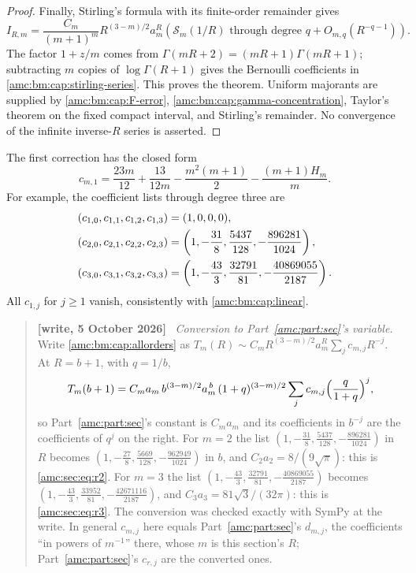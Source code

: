 \documentclass[11pt,letterpaper]{article}
\theoremstyle{remark}\newtheorem{remark}[theorem]{Remark}
\newenvironment{writenotedated}[1]{\par\smallskip\begin{quote}\small\textbf{[write, #1]}\ }{\end{quote}\smallskip}
\begin{document}
\begin{proof}
Finally, Stirling's formula with its finite-order remainder gives
\[
 I_{R,m}=\frac{C_m}{(m+1)^m}R^{(3-m)/2}a_m^R
 \left(\mathcal S_m(1/R)\text{ through degree }q+O_{m,q}(R^{-q-1})\right).
\]
The factor $1+z/m$ comes from $\Gamma(mR+2)=(mR+1)\Gamma(mR+1)$; subtracting $m$ copies of $\log\Gamma(R+1)$ gives the Bernoulli coefficients in \eqref{amc:bm:cap:stirling-series}. This proves the theorem. Uniform majorants are supplied by \eqref{amc:bm:cap:F-error}, \eqref{amc:bm:cap:gamma-concentration}, Taylor's theorem on the fixed compact interval, and Stirling's remainder. No convergence of the infinite inverse-$R$ series is asserted.
\end{proof}

The first correction has the closed form
\begin{equation}\label{amc:bm:cap:kappa}
 c_{m,1}=\frac{23m}{12}+\frac{13}{12m}
 -\frac{m^2(m+1)}2-\frac{(m+1)H_m}{m}.
\end{equation}
For example, the coefficient lists through degree three are
\begin{align}
 (c_{1,0},c_{1,1},c_{1,2},c_{1,3})&=(1,0,0,0),\notag\\
 (c_{2,0},c_{2,1},c_{2,2},c_{2,3})
 &=\left(1,-\frac{31}{8},\frac{5437}{128},-\frac{896281}{1024}\right),\label{amc:bm:cap:coefficients}\\
 (c_{3,0},c_{3,1},c_{3,2},c_{3,3})
 &=\left(1,-\frac{43}{3},\frac{32791}{81},-\frac{40869055}{2187}\right).\notag
\end{align}
All $c_{1,j}$ for $j\ge1$ vanish, consistently with \eqref{amc:bm:cap:linear}.

\begin{writenotedated}{5 October 2026}
\emph{Conversion to Part~\ref{amc:part:sec}'s variable.} Write \eqref{amc:bm:cap:allorders} as $T_m(R)\sim C_mR^{(3-m)/2}a_m^R\sum_jc_{m,j}R^{-j}$. At $R=b+1$, with $q=1/b$,
\[
 T_m(b+1)=C_ma_m\,b^{(3-m)/2}a_m^{\,b}\,(1+q)^{(3-m)/2}\sum_jc_{m,j}\Bigl(\frac q{1+q}\Bigr)^j,
\]
so Part~\ref{amc:part:sec}'s constant is $C_ma_m$ and its coefficients in $b^{-j}$ are the coefficients of $q^j$ on the right. For $m=2$ the list $(1,-\frac{31}8,\frac{5437}{128},-\frac{896281}{1024})$ in $R$ becomes $(1,-\frac{27}8,\frac{5669}{128},-\frac{962949}{1024})$ in $b$, and $C_2a_2=8/(9\sqrt\pi)$: this is \eqref{amc:sec:eq:r2}. For $m=3$ the list $(1,-\frac{43}3,\frac{32791}{81},-\frac{40869055}{2187})$ becomes $(1,-\frac{43}3,\frac{33952}{81},-\frac{42671116}{2187})$, and $C_3a_3=81\sqrt3/(32\pi)$: this is \eqref{amc:sec:eq:r3}. The conversion was checked exactly with SymPy at the write. In general $c_{m,j}$ here equals Part~\ref{amc:part:sec}'s $d_{m,j}$, the coefficients ``in powers of $m^{-1}$'' there, whose $m$ is this section's $R$; Part~\ref{amc:part:sec}'s $c_{r,j}$ are the converted ones.
\end{writenotedated}
\end{document}
